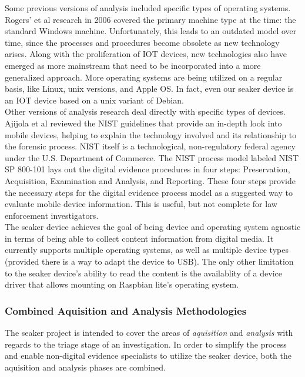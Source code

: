 \documentclass[12pt]{article}
\begin{document}
Some previous versions of analysis included specific types of operating systems.
Rogers' et al\cite{rogers2006computer} research in 2006 covered the primary machine type at
the time: the standard Windows machine.  Unfortunately, this leads to an outdated model over
time, since the processes and procedures become obsolete as new technology arises.  Along with
the proliferation of IOT devices, new technologies also have emerged as more mainstream that
need to be incorporated into a more generalized approach.  More operating systems are being
utilized on a regular basis, like Linux, unix versions, and Apple OS.  In fact, even our
\gls{seaker} device is an IOT device based on a unix variant of Debian.\\

Other versions of analysis research deal directly with specific types of devices.
Ajijola et al\cite{ajijola2014review} reviewed the NIST guidelines that provide an in-depth
look into mobile devices, helping to explain the technology involved and its
relationship to the forensic process.  NIST itself is a technological, non-regulatory
federal agency under the U.S. Department of Commerce.  The NIST process model labeled NIST
SP 800-101 lays out the digital evidence procedures in four steps: Preservation, Acquisition,
Examination and Analysis, and Reporting\cite{ajijola2014review}.  These four steps provide the
necessary steps for the digital evidence process model as a suggested way to evaluate mobile
device information.  This is useful, but not complete for law enforcement investigators.\\

The \gls{seaker} device achieves the goal of being device and operating system agnostic in
terms of being able to collect content information from digital media.  It currently supports
multiple operating systems, as well as multiple device types (provided there is a way to 
adapt the device to USB).  The only other limitation to the \gls{seaker} device's ability to
read the content is the availablity of a device driver that allows mounting on Raspbian lite's
operating system.\\

\subsubsection{Combined Aquisition and Analysis Methodologies}

The \gls{seaker} project is intended to cover the areas of {\em aquisition} and {\em analysis}
with regards to the triage stage of an investigation.  In order to simplify the process and
enable non-digital evidence specialists to utilize the \gls{seaker} device, both the
aquisition and analysis phases are combined.\\
\end{document}
